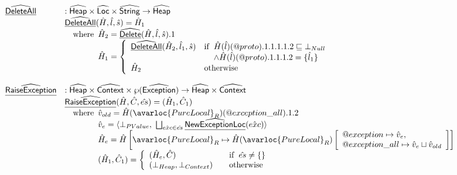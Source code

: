 \[\begin{array}{ll}
\ahf {DeleteAll} &: \aHeap \times \aLoc \times \abs{String} \rightarrow \aHeap\\
& \ahf{DeleteAll} (\hat{H}, \hat{l}, \hat{s}) = \hat{H}_1\\
& \quad\wherec{
  \hat{H}_2 = \ahf{Delete}(\hat{H}, \hat{l}, \hat{s}).1\\
  \hat{H}_1 = \left\{
    \begin{array}{ll}
      \ahf{DeleteAll}(\hat{H}_2, \hat{l}_1, \hat{s}) & \ifc{\hat{H}(\hat{l})(@proto).1.1.1.1.2 \sqsubseteq \bot_{Null} \\ \land \hat{H}(\hat{l})(@proto).1.1.1.2 = \{ \hat{l}_1\}}\\
      \hat{H}_2 & \owc
    \end{array}
  \right.
}
\\

\\



\ahf{RaiseException} & : \aHeap \times \abs{Context} \times \powerset{\abs{Exception}} \rightarrow \aHeap \times \abs{Context}\\
 & \ahf{RaiseException}(\hat{H},\hat{C}, \hat{es}) = (\hat{H}_1, \hat{C}_1) \\
 & \quad\wherec{
   \hat{v}_{old} = \hat{H}(\avarloc{PureLocal}_R)(\varprop{exception\_all}).1.2 \\
   \hat{v}_e = \langle \bot_{PValue},\ \bigsqcup_{\hat{exc}\in\hat{es}}\ahf{NewExceptionLoc}(\hat{exc}) \rangle \\
   \hat{H}_e = \hat{H}\left[\avarloc{PureLocal}_R\mapsto \hat{H}(\avarloc{PureLocal}_R)
     \left[\begin{array}{l}
         \varprop{exception}\mapsto \hat{v}_e, \\
         \varprop{exception\_all}\mapsto \hat{v}_e \sqcup \hat{v}_{old} 
     \end{array}\right]\right]\\
   (\hat{H}_1, \hat{C}_1) = \left\{
     \begin{array}{ll}
       (\hat{H}_e, \hat{C})&\quad\ifc{\hat{es} \neq \{\}}\\
       (\bot_{Heap}, \bot_{Context}) &\quad\owc
     \end{array}
   \right.\\
}\\
\\


\end{array}\]
